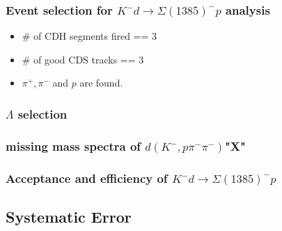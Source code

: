 \subsubsection{Event selection for $K^-d \rightarrow \Sigma(1385)^-p$ analysis}
\begin{itemize}
\item \# of CDH segments fired == 3
\item \# of good CDS tracks == 3
\item $\pi^+,\pi^-$ and $p$ are found.
\end{itemize}

\subsubsection{$\Lambda$ selection}

\subsubsection{missing mass spectra of $d(K^-,p\pi^-\pi^-)$"X"}

\subsubsection{Acceptance and efficiency of $K^-d \rightarrow \Sigma(1385)^-p$}


\subsection{Systematic Error}



